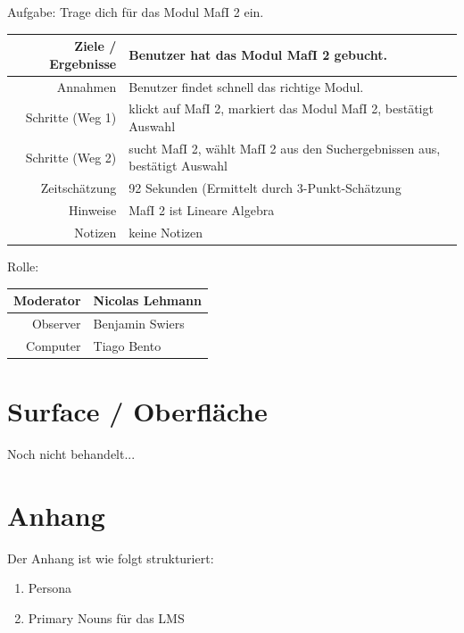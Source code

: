 \documentclass{article}
\begin{document}
Aufgabe: Trage dich für das Modul MafI 2 ein.\\
\begin{tabular}{|r|l|}
\hline
Ziele / Ergebnisse & Benutzer hat das Modul MafI 2 gebucht.\\
\hline
Annahmen & Benutzer findet schnell das richtige Modul.\\
\hline
Schritte (Weg 1) & klickt auf MafI 2, markiert das Modul MafI 2, bestätigt Auswahl\\
Schritte (Weg 2) & sucht MafI 2, wählt MafI 2 aus den Suchergebnissen aus, bestätigt Auswahl\\
\hline
Zeitschätzung & 92 Sekunden (Ermittelt durch 3-Punkt-Schätzung\\
\hline
Hinweise & MafI 2 ist Lineare Algebra\\
\hline
Notizen & keine Notizen\\
\hline
\end{tabular}
Rolle:\\
\begin{tabular}{|r|l|}
\hline
Moderator & Nicolas Lehmann\\
\hline
Observer & Benjamin Swiers\\
\hline
Computer & Tiago Bento\\
\hline
\end{tabular}


\newpage

\section{Surface / Oberfläche}

Noch nicht behandelt...

\newpage

\section{Anhang}

Der Anhang ist wie folgt strukturiert:
\begin{enumerate}
\item Persona
\item Primary Nouns für das LMS
\end{enumerate}

 

\end{document}
